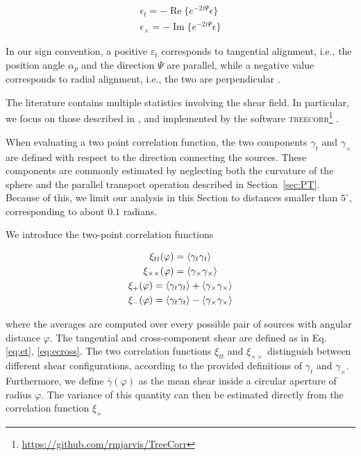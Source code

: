 		\begin{gather}
			\epsilon_t = -\operatorname{Re}\{e^{-2i\Psi}\epsilon \}
			\label{eq:et}
			\\
			\epsilon_\times = -\operatorname{Im}\{e^{-2i\Psi}\epsilon\}
			\label{eq:ecross}
		\end{gather}
		
		In our sign convention, a positive $\varepsilon_t$ corresponds to tangential alignment, i.e., the position angle $\alpha_p$ and the direction $\Psi$ are parallel, while a negative value corresponds to radial alignment, i.e., the two are perpendicular \citep{Kilbinger2015}. 
		
				
		The literature contains multiple statistics involving the shear field. In particular, we focus on those described in  \cite{Schneider2002}, \cite{Eifler2010} and implemented by the software \textsc{treecorr}\footnote{\url{https://github.com/rmjarvis/TreeCorr}} \citep{Jarvis2004}. 
		
		When evaluating a two point correlation function, the two components $\gamma_t$ and $\gamma_\times$ are defined with respect to the direction connecting the sources. These components are commonly estimated by neglecting both the curvature of the sphere and the parallel transport operation described in Section~\ref{sec:PT}. Because of this, we limit our analysis in this Section to distances smaller than $5^\circ$, corresponding to about $0.1$ radians.
		
		We introduce the two-point correlation functions
		
		\begin{gather}
			\xi_{tt}(\varphi) = \left\langle \gamma_t \gamma_t \right\rangle
			\label{eq:xitt}
			\\
			\xi_{\times \times}(\varphi) = \left\langle \gamma_\times \gamma_\times \right\rangle
			\label{eq:xicc}
			\\
			\xi_+ (\varphi)= \left\langle \gamma_t \gamma_t \right\rangle + \left\langle \gamma_\times \gamma_\times \right\rangle 
			\\
			\xi_-  (\varphi)= \left\langle \gamma_t \gamma_t \right\rangle - \left\langle \gamma_\times \gamma_\times \right\rangle
		\end{gather}
		
		where the averages are computed over every possible pair of sources with angular distance $\varphi$. The tangential and cross-component shear are defined as in Eq. \eqref{eq:et}, \eqref{eq:ecross}. The two correlation functions $\xi_{tt}$ and $\xi_{\times \times}$ distinguish between different shear configurations, according to the provided definitions of $\gamma_t$ and $\gamma_\times$.
		Furthermore, we define $\overline{\gamma}(\varphi)$ as the mean shear inside a circular aperture of radius $\varphi$. The variance of this quantity can then be estimated directly from the correlation function $\xi_+$
		
